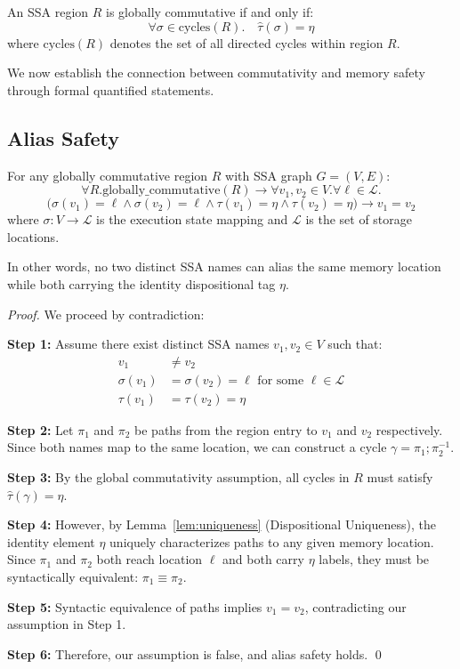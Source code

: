 \documentclass[journal]{IEEEtran}
\begin{document}
\begin{definition}
An SSA region $R$ is globally commutative if and only if:
$$\forall \sigma \in \text{cycles}(R). \quad \hat{\tau}(\sigma) = \eta$$
where $\text{cycles}(R)$ denotes the set of all directed cycles within region $R$.
\end{definition}

We now establish the connection between commutativity and memory safety through formal quantified statements.

\subsection{Alias Safety}

\begin{theorem}
For any globally commutative region $R$ with SSA graph $G = (V, E)$:
$$\forall R. \text{globally\_commutative}(R) \rightarrow \forall v_1, v_2 \in V. \forall \ell \in \mathcal{L}. $$
$$\big( \sigma(v_1) = \ell \land \sigma(v_2) = \ell \land \tau(v_1) = \eta \land \tau(v_2) = \eta \big) \rightarrow v_1 = v_2$$
where $\sigma: V \to \mathcal{L}$ is the execution state mapping and $\mathcal{L}$ is the set of storage locations.

In other words, no two distinct SSA names can alias the same memory location while both carrying the identity dispositional tag $\eta$.
\end{theorem}

\begin{proof}
We proceed by contradiction:

\textbf{Step 1:} Assume there exist distinct SSA names $v_1, v_2 \in V$ such that:
\begin{align}
v_1 &\neq v_2 \\
\sigma(v_1) &= \sigma(v_2) = \ell \text{ for some } \ell \in \mathcal{L} \\
\tau(v_1) &= \tau(v_2) = \eta
\end{align}

\textbf{Step 2:} Let $\pi_1$ and $\pi_2$ be paths from the region entry to $v_1$ and $v_2$ respectively. Since both names map to the same location, we can construct a cycle $\gamma = \pi_1 ; \pi_2^{-1}$.

\textbf{Step 3:} By the global commutativity assumption, all cycles in $R$ must satisfy $\hat{\tau}(\gamma) = \eta$.

\textbf{Step 4:} However, by Lemma~\ref{lem:uniqueness} (Dispositional Uniqueness), the identity element $\eta$ uniquely characterizes paths to any given memory location. Since $\pi_1$ and $\pi_2$ both reach location $\ell$ and both carry $\eta$ labels, they must be syntactically equivalent: $\pi_1 \equiv \pi_2$.

\textbf{Step 5:} Syntactic equivalence of paths implies $v_1 = v_2$, contradicting our assumption in Step 1.

\textbf{Step 6:} Therefore, our assumption is false, and alias safety holds. \qed
\end{proof}
\end{document}
